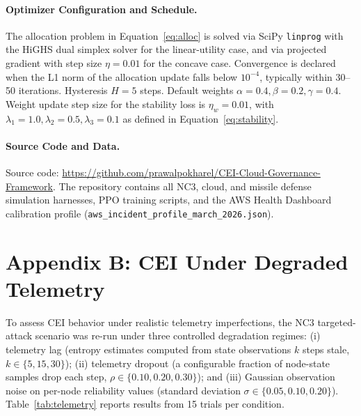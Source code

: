 \documentclass[runningheads]{llncs}
\begin{document}
\paragraph{Optimizer Configuration and Schedule.}
The allocation problem in Equation~\ref{eq:alloc} is solved via SciPy \texttt{linprog} with the HiGHS dual simplex solver for the linear-utility case, and via projected gradient with step size $\eta = 0.01$ for the concave case. Convergence is declared when the L1 norm of the allocation update falls below $10^{-4}$, typically within 30--50 iterations. Hysteresis $H = 5$ steps. Default weights $\alpha = 0.4, \beta = 0.2, \gamma = 0.4$. Weight update step size for the stability loss is $\eta_w = 0.01$, with $\lambda_1 = 1.0, \lambda_2 = 0.5, \lambda_3 = 0.1$ as defined in Equation~\ref{eq:stability}.

\paragraph{Source Code and Data.}
Source code: \url{https://github.com/prawalpokharel/CEI-Cloud-Governance-Framework}. The repository contains all NC3, cloud, and missile defense simulation harnesses, PPO training scripts, and the AWS Health Dashboard calibration profile (\texttt{aws\_incident\_profile\_march\_2026.json}).

\section*{Appendix B: CEI Under Degraded Telemetry}
\label{app:telemetry}

To assess CEI behavior under realistic telemetry imperfections, the NC3 targeted-attack scenario was re-run under three controlled degradation regimes: (i) telemetry lag (entropy estimates computed from state observations $k$ steps stale, $k \in \{5, 15, 30\}$); (ii) telemetry dropout (a configurable fraction of node-state samples drop each step, $\rho \in \{0.10, 0.20, 0.30\}$); and (iii) Gaussian observation noise on per-node reliability values (standard deviation $\sigma \in \{0.05, 0.10, 0.20\}$). Table~\ref{tab:telemetry} reports results from 15 trials per condition.
\end{document}
